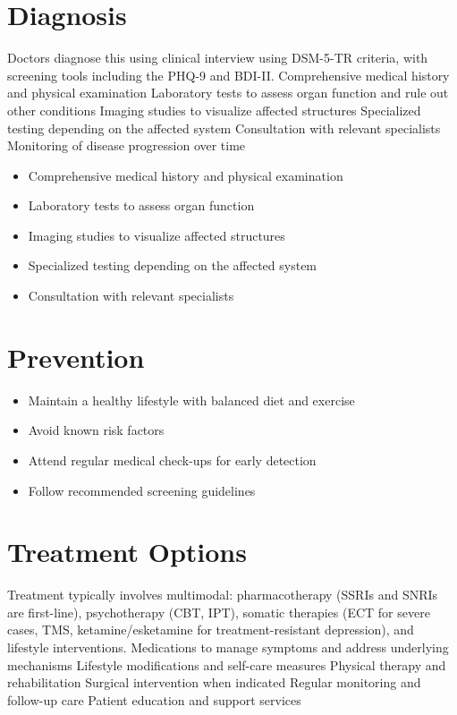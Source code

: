 \section{Diagnosis}
Doctors diagnose this using clinical interview using DSM-5-TR criteria, with screening tools including the PHQ-9 and BDI-II. Comprehensive medical history and physical examination Laboratory tests to assess organ function and rule out other conditions Imaging studies to visualize affected structures Specialized testing depending on the affected system Consultation with relevant specialists Monitoring of disease progression over time

\begin{itemize}[noitemsep]
  \item Comprehensive medical history and physical examination
  \item Laboratory tests to assess organ function
  \item Imaging studies to visualize affected structures
  \item Specialized testing depending on the affected system
  \item Consultation with relevant specialists
\end{itemize}
\section{Prevention}
\begin{itemize}[noitemsep]
  \item Maintain a healthy lifestyle with balanced diet and exercise
  \item Avoid known risk factors
  \item Attend regular medical check-ups for early detection
  \item Follow recommended screening guidelines
\end{itemize}
\section{Treatment Options}
Treatment typically involves multimodal: pharmacotherapy (SSRIs and SNRIs are first-line), psychotherapy (CBT, IPT), somatic therapies (ECT for severe cases, TMS, ketamine/esketamine for treatment-resistant depression), and lifestyle interventions. Medications to manage symptoms and address underlying mechanisms Lifestyle modifications and self-care measures Physical therapy and rehabilitation Surgical intervention when indicated Regular monitoring and follow-up care Patient education and support services

